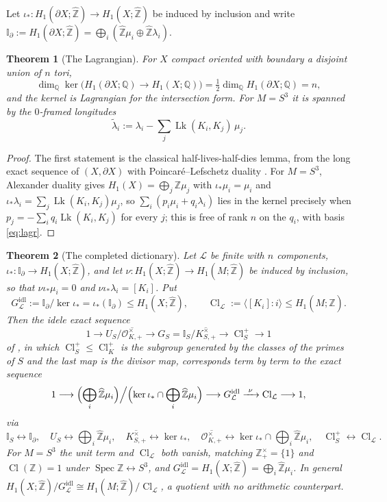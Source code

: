 \documentclass[11pt]{amsart}
\numberwithin{equation}{section}
\newtheorem{theorem}{Theorem}[section]
\theoremstyle{definition}
\theoremstyle{remark}
\newcommand{\Z}{\mathbb{Z}}
\newcommand{\Q}{\mathbb{Q}}
\newcommand{\hZ}{\widehat{\Z}}
\newcommand{\cL}{\mathcal{L}}
\newcommand{\cO}{\mathcal{O}}
\newcommand{\Idl}{\mathbb{I}}
\newcommand{\Cl}{\operatorname{Cl}}
\newcommand{\Lk}{\operatorname{Lk}}
\newcommand{\Spec}{\operatorname{Spec}}
\newcommand{\tlam}{\widetilde\lambda}
\begin{document}
Let $\iota_*:H_1(\partial X;\hZ)\to H_1(X;\hZ)$ be induced by inclusion and write
$\Idl_\partial:=H_1(\partial X;\hZ)=\bigoplus_i(\hZ\mu_i\oplus\hZ\lambda_i)$.

\begin{theorem}[The Lagrangian]\label{thm:hlhd}
For $X$ compact oriented with boundary a disjoint union of $n$ tori,
\[
\dim_\Q\ker\bigl(H_1(\partial X;\Q)\to H_1(X;\Q)\bigr)=\tfrac12\dim_\Q H_1(\partial X;\Q)=n,
\]
and the kernel is Lagrangian for the intersection form. For $M=S^3$ it is spanned by the
$0$-framed longitudes
\begin{equation}\label{eq:lagr}
\tlam_i:=\lambda_i-\sum_j\Lk(K_i,K_j)\,\mu_j .
\end{equation}
\end{theorem}

\begin{proof}
The first statement is the classical half-lives-half-dies lemma, from the long exact sequence
of $(X,\partial X)$ with Poincaré--Lefschetz duality \cite[Ch.~4]{Thurston}. For $M=S^3$, Alexander duality gives
$H_1(X)=\bigoplus_j\Z\mu_j$ with $\iota_*\mu_i=\mu_i$ and
$\iota_*\lambda_i=\sum_j\Lk(K_i,K_j)\mu_j$, so $\sum_i(p_i\mu_i+q_i\lambda_i)$ lies in the
kernel precisely when $p_j=-\sum_iq_i\Lk(K_i,K_j)$ for every $j$; this is free of rank $n$ on
the $q_i$, with basis \eqref{eq:lagr}.
\end{proof}

\begin{theorem}[The completed dictionary]\label{thm:dict}
Let $\cL$ be finite with $n$ components, $\iota_*:\Idl_\partial\to H_1(X;\hZ)$, and let
$\nu:H_1(X;\hZ)\to H_1(M;\hZ)$ be induced by inclusion, so that $\nu\iota_*\mu_i=0$ and
$\nu\iota_*\lambda_i=[K_i]$. Put
\[
G_\cL^{\mathrm{idl}}:=\Idl_\partial/\ker\iota_*=\iota_*(\Idl_\partial)\le H_1(X;\hZ),\qquad
\Cl_\cL:=\bigl\langle[K_i]:i\bigr\rangle\le H_1(M;\hZ).
\]
Then the idele exact sequence
\[
1\longrightarrow U_S/\overline{\cO^\times_{K,+}}\longrightarrow G_S=\Idl_S/\overline{K^\times_{S,+}}\longrightarrow\Cl^+_S\longrightarrow1
\]
of \cite[Prop.~2.5]{Main}, in which $\Cl^+_S\le\Cl^+_K$ is the \emph{subgroup} generated by
the classes of the primes of $S$ and the last map is the divisor map, corresponds term by
term to the exact sequence
\[
1\longrightarrow\Bigl(\bigoplus_i\hZ\mu_i\Bigr)\Big/\Bigl(\ker\iota_*\cap\bigoplus_i\hZ\mu_i\Bigr)
\longrightarrow G_\cL^{\mathrm{idl}}
\xrightarrow{\ \nu\ }\Cl_\cL\longrightarrow1,
\]
via
\[
\Idl_S\leftrightarrow\Idl_\partial,\quad
U_S\leftrightarrow\bigoplus_i\hZ\mu_i,\quad
\overline{K^\times_{S,+}}\leftrightarrow\ker\iota_*,\quad
\overline{\cO^\times_{K,+}}\leftrightarrow\ker\iota_*\cap\bigoplus_i\hZ\mu_i,\quad
\Cl^+_S\leftrightarrow\Cl_\cL .
\]
For $M=S^3$ the unit term and $\Cl_\cL$ both vanish, matching $\Z^\times_+=\{1\}$ and
$\Cl(\Z)=1$ under $\Spec\Z\leftrightarrow S^3$, and $G_\cL^{\mathrm{idl}}=H_1(X;\hZ)=\bigoplus_i\hZ\mu_i$.
In general $H_1(X;\hZ)/G_\cL^{\mathrm{idl}}\cong H_1(M;\hZ)/\Cl_\cL$, a quotient with no
arithmetic counterpart.
\end{theorem}
\end{document}
